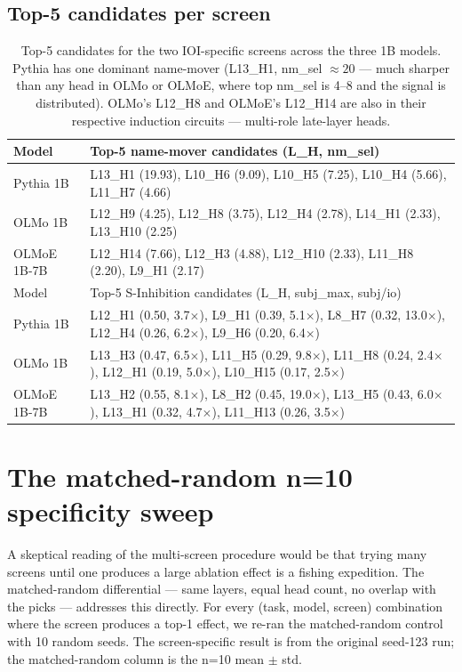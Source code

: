 \documentclass[11pt]{article}
\begin{document}
\subsection{Top-5 candidates per screen}

\begin{table}[h]
\centering
\small
\begin{tabular}{p{2.5cm}p{11cm}}
\toprule
Model & Top-5 name-mover candidates (L\_H, nm\_sel) \\
\midrule
Pythia 1B & L13\_H1 (19.93), L10\_H6 (9.09), L10\_H5 (7.25), L10\_H4 (5.66), L11\_H7 (4.66) \\
OLMo 1B & L12\_H9 (4.25), L12\_H8 (3.75), L12\_H4 (2.78), L14\_H1 (2.33), L13\_H10 (2.25) \\
OLMoE 1B-7B & L12\_H14 (7.66), L12\_H3 (4.88), L12\_H10 (2.33), L11\_H8 (2.20), L9\_H1 (2.17) \\
\midrule
Model & Top-5 S-Inhibition candidates (L\_H, subj\_max, subj/io) \\
\midrule
Pythia 1B & L12\_H1 (0.50, 3.7$\times$), L9\_H1 (0.39, 5.1$\times$), L8\_H7 (0.32, 13.0$\times$), L12\_H4 (0.26, 6.2$\times$), L9\_H6 (0.20, 6.4$\times$) \\
OLMo 1B & L13\_H3 (0.47, 6.5$\times$), L11\_H5 (0.29, 9.8$\times$), L11\_H8 (0.24, 2.4$\times$), L12\_H1 (0.19, 5.0$\times$), L10\_H15 (0.17, 2.5$\times$) \\
OLMoE 1B-7B & L13\_H2 (0.55, 8.1$\times$), L8\_H2 (0.45, 19.0$\times$), L13\_H5 (0.43, 6.0$\times$), L13\_H1 (0.32, 4.7$\times$), L11\_H13 (0.26, 3.5$\times$) \\
\bottomrule
\end{tabular}
\caption{Top-5 candidates for the two IOI-specific screens across the three 1B models. Pythia has one dominant name-mover (L13\_H1, nm\_sel $\approx 20$ --- much sharper than any head in OLMo or OLMoE, where top nm\_sel is 4--8 and the signal is distributed). OLMo's L12\_H8 and OLMoE's L12\_H14 are also in their respective induction circuits --- multi-role late-layer heads.}
\label{tab:ioi-candidates}
\end{table}

\section{The matched-random n=10 specificity sweep}
\label{sec:matched-random}

A skeptical reading of the multi-screen procedure would be that trying many screens until one produces a large ablation effect is a fishing expedition. The matched-random differential --- same layers, equal head count, no overlap with the picks --- addresses this directly. For every (task, model, screen) combination where the screen produces a top-1 effect, we re-ran the matched-random control with 10 random seeds. The screen-specific result is from the original seed-123 run; the matched-random column is the n=10 mean $\pm$ std.
\end{document}
